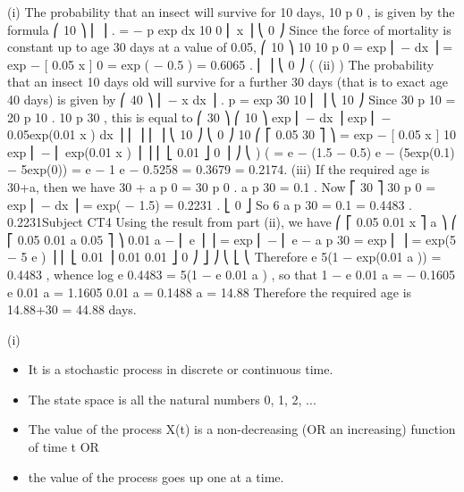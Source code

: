 \documentclass[a4paper,12pt]{article}
\begin{document}
\begin{enumerate}
\newpage
(i)
The probability that an insect will survive for 10 days, 10 p 0 , is given by the formula
⎛ 10
⎞
⎜
⎟ .
=
−
\mu
p
exp
dx
10 0
⎜ \int x ⎟
⎝ 0
⎠
Since the force of mortality is constant up to age 30 days at a value of 0.05,
⎛ 10
⎞
10
10 p 0 = exp ⎜ −  dx ⎟ = exp − [ 0.05 x ] 0 = exp ( − 0.5 ) = 0.6065 .
⎜
⎟
⎝ 0
⎠
(
(ii)
)
The probability that an insect 10 days old will survive for a further 30 days (that is to exact age 40 days) is given by
⎛ 40
⎞
⎜ − \int \mu x dx ⎟ .
p
=
exp
30 10
⎜
⎟
⎝ 10
⎠
Since
30 p 10
= 20 p 10 . 10 p 30 , this is equal to
⎛ 30
⎞
⎛ 10
⎞
exp ⎜ −  dx ⎟ exp ⎜ − \int 0.05exp(0.01 x ) dx ⎟
⎜
⎟
⎜
⎟
⎝ 10
⎠
⎝ 0
⎠
10
⎛ ⎡ 0.05
30
⎤ ⎞
= exp − [ 0.05 x ] 10 exp ⎜ − ⎢
exp(0.01 x ) ⎥ ⎟
⎜ ⎣ 0.01
⎦ 0 ⎟ ⎠
⎝
)
(
= e − (1.5 − 0.5) e − (5exp(0.1) − 5exp(0))
= e − 1 e − 0.5258 = 0.3679  = 0.2174.
(iii)
If the required age is 30+a, then we have
30 + a
p 0 =
30
p 0 . a p 30 = 0.1 .
Now
⎡ 30
⎤
30 p 0 = exp ⎢ −  dx ⎥ = exp( − 1.5) = 0.2231 .
⎣ 0
⎦
So
6
a
p 30 =
0.1
= 0.4483 .
0.2231Subject CT4 %
Using the result from part (ii), we have
⎛ ⎡ 0.05 0.01 x ⎤ a ⎞
⎛ ⎡ 0.05 0.01 a 0.05 ⎤ ⎞
0.01 a
− ⎢
e ⎥ ⎟ = exp ⎜ − ⎢
e
−
a p 30 = exp ⎜
⎟ = exp(5 − 5 e )
⎥
⎜ ⎣ 0.01
⎟
0.01
0.01
⎦ 0 ⎠
⎦ ⎠
⎝ ⎣
⎝
Therefore
e 5(1 − exp(0.01 a )) = 0.4483 ,
whence
log e 0.4483 = 5(1 − e 0.01 a ) ,
so that
1 − e 0.01 a = − 0.1605
e 0.01 a = 1.1605
0.01 a = 0.1488
a = 14.88
Therefore the required age is 14.88+30 = 44.88 days.


\newpage

(i)
\begin{itemize}
\item It is a stochastic process in discrete or continuous time.
\item The state space is all the natural numbers {0, 1, 2, ... }
\item The value of the process X(t) is a non-decreasing (OR an increasing) function of
time t
OR

\item the value of the process goes up one at a time.
\end{itemize}


\end{enumerate}
\end{document}
